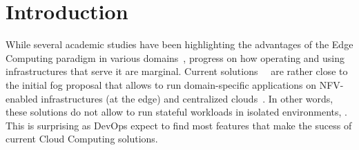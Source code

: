 \section{Introduction}
\label{sec:intro}



While several academic studies have been highlighting the advantages
of the Edge Computing paradigm in various
domains~\cite{bonomi2012fog,zhang2015cloud,yi2015fog,shi2016edge,satyanarayanan2017emergence},
progress on how operating and using infrastructures that serve it are marginal.  
Current solutions~\cite{amazon:lambda-edge}~\cite{akamai:cloudlets} are rather close to the
initial fog proposal that allows to run domain-specific applications
on  NFV-enabled infrastructures (at the edge) and
centralized clouds~\cite{bonomi2012fog}.  In other words, %
these solutions do not allow to run stateful
workloads in isolated environments, .
%
This is surprising as DevOps expect to find most features that make the sucess of
current Cloud Computing solutions.




